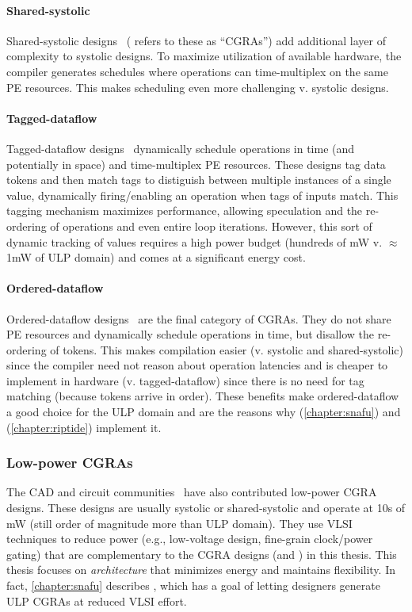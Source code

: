 \paragraph{Shared-systolic}
Shared-systolic designs~\cite{remarc,adres,morphosys,matrix,karunaratne2017hycube} (\cite{weng2020hybrid} refers to these as ``CGRAs'') add additional layer of complexity to systolic designs.
% 
To maximize utilization of available hardware, the compiler generates schedules where operations can time-multiplex on the same PE resources.
% 
This makes scheduling even more challenging v. systolic designs.

\paragraph{Tagged-dataflow}
Tagged-dataflow designs~\cite{swanson2003wavescalarvoitsechov2014single,ttda,trips,parashar2013triggered} dynamically schedule operations in time (and potentially in space) and time-multiplex PE resources.
% 
These designs tag data tokens and then match tags to distiguish between multiple instances of a single value, dynamically firing/enabling an operation when tags of inputs match.
% 
This tagging mechanism maximizes performance, allowing speculation and the re-ordering of operations and even entire loop iterations.
% 
However, this sort of dynamic tracking of values requires a high power budget (hundreds of mW v. $\approx$1mW of ULP domain) and comes at a significant energy cost.

\paragraph{Ordered-dataflow}
Ordered-dataflow designs~\cite{snafu,plasticine,dyser} are the final category of CGRAs.
% 
They do not share PE resources and dynamically schedule operations in time, but disallow the re-ordering of tokens.
% 
This makes compilation easier (v. systolic and shared-systolic) since the compiler need not reason about operation latencies and is cheaper to implement in hardware (v. tagged-dataflow) since there is no need for tag matching (because tokens arrive in order).
% 
These benefits make ordered-dataflow a good choice for the ULP domain and are the reasons why \snafu (\autoref{chapter:snafu}) and \riptide (\autoref{chapter:riptide}) implement it.

\subsubsection{Low-power CGRAs}
The CAD and circuit communities~\cite{ipa,cma,srp,karunaratne2017hycube} have also contributed low-power CGRA designs.
% 
These designs are usually systolic or shared-systolic and operate at 10s of mW (still order of magnitude more than ULP domain).
% 
They use VLSI techniques to reduce power (e.g., low-voltage design, fine-grain clock/power gating) that are complementary to the CGRA designs (\snafu and \riptide) in this thesis.
%
This thesis focuses on {\em architecture} that minimizes energy and maintains flexibility.
%
In fact, \autoref{chapter:snafu} describes \snafu, which has a goal of letting designers generate ULP CGRAs at reduced VLSI effort.

